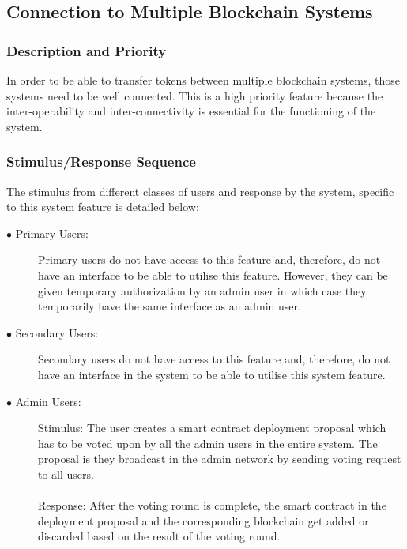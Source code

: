 \documentclass[a4paper,twoside,phd]{BYUPhys}
\begin{document}
\subsection{Connection to Multiple Blockchain Systems}
\subsubsection{Description and Priority}
In order to be able to transfer tokens between multiple blockchain systems, those systems need to be well connected. This is a high priority feature because the inter-operability and inter-connectivity is essential for the functioning of the system. 
\subsubsection{Stimulus/Response Sequence}
The stimulus from different classes of users and response by the system, specific to this system feature is detailed below:
\begin{description}
\item[$\bullet$ Primary Users:] Primary users do not have access to this feature and, therefore, do not have an interface to be able to utilise this feature. However, they can be given temporary authorization by an admin user in which case they temporarily have the same interface as an admin user.  
\item[$\bullet$ Secondary Users:]
Secondary users do not have access to this feature and, therefore, do not have an interface in the system to be able to utilise this system feature.
\item[$\bullet$ Admin Users:]
Stimulus: The user creates a smart contract deployment proposal which has to be voted upon by all the admin users in the entire system. The proposal is they broadcast in the admin network by sending voting request to all users.
\\
\\
Response: After the voting round is complete, the smart contract in the deployment proposal and the corresponding blockchain get added or discarded based on the result of the voting round. 
\end{description}
\end{document}
